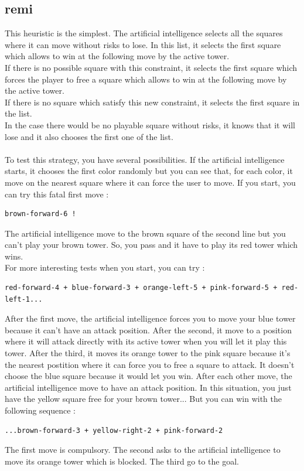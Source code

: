 \documentclass[a4paper, 11pt]{article}
\begin{document}
\subsection{remi}
This heuristic is the simplest. The artificial intelligence selects all the squares where it can move without risks to lose. In this list, it selects the first square which allows to win at the following move by the active tower.\\
If there is no possible square with this constraint, it selects the first square which forces the player to free a square which allows to win at the following move by the active tower.\\
If there is no square which satisfy this new constraint, it selects the first square in the list.\\
In the case there would be no playable square without risks, it knows that it will lose and it also chooses the first one of the list.\\ \\
To test this strategy, you have several possibilities. If the artificial intelligence starts, it chooses the first color randomly but you can see that, for each color, it move on the nearest square where it can force the user to move.
If you start, you can try this fatal first move : 
\begin{verbatim}
brown-forward-6 !
\end{verbatim}
The artificial intelligence move to the brown square of the second line but you can't play your brown tower. So, you pass and it have to play its red tower which wins.\\
For more interesting tests when you start, you can try :
\begin{verbatim}
red-forward-4 + blue-forward-3 + orange-left-5 + pink-forward-5 + red-left-1...
\end{verbatim}
After the first move, the artificial intelligence forces you to move your blue tower because it can't have an attack position. After the second, it move to a position where it will attack directly with its active tower when you will let it play this tower.
After the third, it moves its orange tower to the pink square because it's the nearest postition where it can force you to free a square to attack. It doesn't choose the blue square because it would let you win. After each other move, the artificial intelligence move to have an attack position. 
In this situation, you just have the yellow square free for your brown tower... But you can win with the following sequence : 
\begin{verbatim}
...brown-forward-3 + yellow-right-2 + pink-forward-2
\end{verbatim}
The first move is compulsory. The second asks to the artificial intelligence to move its orange tower which is blocked. The third go to the goal.
\end{document}

